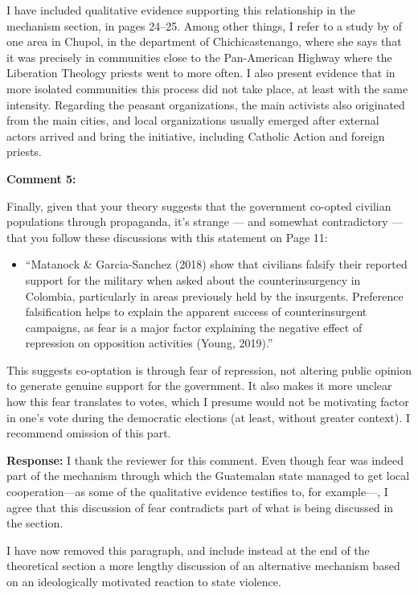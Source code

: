 \documentclass[12pt, a4paper, notitlepage]{article}
\begin{document}
I have included qualitative evidence supporting this relationship in the mechanism section, in pages 24--25. Among other things, I refer to a study by \citet{Esparza:2018uw} of one area in Chupol, in the department of Chichicastenango, where she says that it was precisely in communities close to the Pan-American Highway where the Liberation Theology priests went to more often. I also present evidence that in more isolated communities this process did not take place, at least with the same intensity. Regarding the peasant organizations, the main activists also originated from the main cities, and local organizations usually emerged after external actors arrived and bring the initiative, including Catholic Action and foreign priests.

\vspace{15pt}
\noindent\textbf{Comment 5:}
\begin{displayquote}
Finally, given that your theory suggests that the government co-opted civilian populations through propaganda, it’s strange — and somewhat contradictory — that you follow these discussions with this statement on Page 11:
\begin{itemize}
  \item[] ``Matanock \& Garcia-Sanchez (2018) show that civilians falsify their reported support for the military when asked about the counterinsurgency in Colombia, particularly in areas previously held by the insurgents. Preference falsification helps to explain the apparent success of counterinsurgent campaigns, as fear is a major factor explaining the negative effect of repression on opposition activities (Young, 2019).''
\end{itemize}
This suggests co-optation is through fear of repression, not altering public opinion to generate genuine support for the government. It also makes it more unclear how this fear translates to votes, which I presume would not be motivating factor in one’s vote during the democratic elections (at least, without greater context). I recommend omission of this part.
\end{displayquote}

\noindent\textbf{Response:} I thank the reviewer for this comment. Even though fear was indeed part of the mechanism through which the Guatemalan state managed to get local cooperation---as some of the qualitative evidence testifies to, for example---, I agree that this discussion of fear contradicts part of what is being discussed in the section.

I have now removed this paragraph, and include instead at the end of the theoretical section a more lengthy discussion of an alternative mechanism based on an ideologically motivated reaction to state violence.
\end{document}
